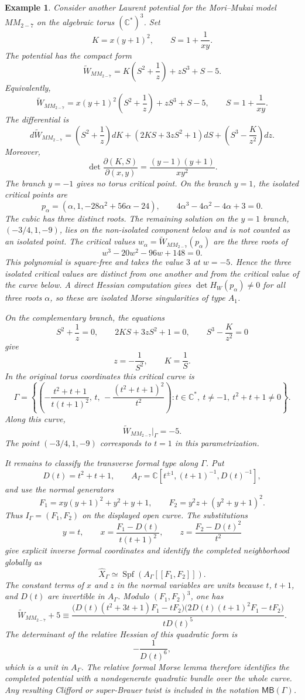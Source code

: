 \documentclass[11pt]{amsart}
\newtheorem{example}{Example}[section]
\newcommand{\MBcat}[1]{\mathsf{MB}(#1)}
\begin{document}
\begin{example}
Consider another Laurent potential for the Mori--Mukai model $MM_{2-7}$ on the
algebraic torus $(\mathbb{C}^*)^3$. Set
\[
K=x(y+1)^2,
\qquad
S=1+\frac{1}{xy}.
\]
The potential has the compact form
\[
\widetilde W_{MM_{2-7}}=K\left(S^2+\frac{1}{z}\right)+zS^3+S-5.
\]
Equivalently,
\[
\widetilde W_{MM_{2-7}}
=x(y+1)^2\left(S^2+\frac{1}{z}\right)+zS^3+S-5,
\qquad S=1+\frac{1}{xy}.
\]
The differential is
\[
d\widetilde W_{MM_{2-7}}
=\left(S^2+\frac{1}{z}\right)dK
+\left(2KS+3zS^2+1\right)dS
+\left(S^3-\frac{K}{z^2}\right)dz.
\]
Moreover,
\[
\det\frac{\partial(K,S)}{\partial(x,y)}=\frac{(y-1)(y+1)}{xy^2}.
\]
The branch $y=-1$ gives no torus critical point. On the branch $y=1$, the
isolated critical points are
\[
p_{\alpha}=\left(\alpha,1,-28\alpha^2+56\alpha-24\right),
\qquad
4\alpha^3-4\alpha^2-4\alpha+3=0.
\]
The cubic has three distinct roots. The remaining solution on the $y=1$ branch,
$(-3/4,1,-9)$, lies on the non-isolated component below and is not counted as
an isolated point. The critical values
$w_{\alpha}=\widetilde W_{MM_{2-7}}(p_{\alpha})$ are the three roots of
\[
w^3-20w^2-96w+148=0.
\]
This polynomial is square-free and takes the value $3$ at $w=-5$. Hence the
three isolated critical values are distinct from one another and from the
critical value of the curve below.
A direct Hessian computation gives $\det H_W(p_{\alpha})\neq0$ for all three
roots $\alpha$, so these are isolated Morse singularities of type $A_1$.

On the complementary branch, the equations
\[
S^2+\frac{1}{z}=0,
\qquad
2KS+3zS^2+1=0,
\qquad
S^3-\frac{K}{z^2}=0
\]
give
\[
z=-\frac{1}{S^2},
\qquad
K=\frac{1}{S}.
\]
In the original torus coordinates this critical curve is
\[
\Gamma=\left\{\left(-\frac{t^2+t+1}{t(t+1)^2},\,t,\,-\frac{(t^2+t+1)^2}{t^2}\right):
t\in\mathbb{C}^*,\ t\neq -1,\ t^2+t+1\neq0\right\}.
\]
Along this curve,
\[
\widetilde W_{MM_{2-7}}|_{\Gamma}=-5.
\]
The point $(-3/4,1,-9)$ corresponds to $t=1$ in this parametrization.

It remains to classify the transverse formal type along $\Gamma$. Put
\[
D(t)=t^2+t+1,
\qquad
A_{\Gamma}=\mathbb C[t^{\pm1},(t+1)^{-1},D(t)^{-1}],
\]
and use the normal generators
\[
F_1=xy(y+1)^2+y^2+y+1,
\qquad
F_2=y^2z+(y^2+y+1)^2.
\]
Thus $I_{\Gamma}=(F_1,F_2)$ on the displayed open curve. The substitutions
\[
y=t,
\qquad
x=\frac{F_1-D(t)}{t(t+1)^2},
\qquad
z=\frac{F_2-D(t)^2}{t^2}
\]
give explicit inverse formal coordinates and identify the completed
neighborhood globally as
\[
\widehat X_{\Gamma}\simeq
\operatorname{Spf}(A_{\Gamma}[[F_1,F_2]]).
\]
The constant terms of $x$ and $z$ in the normal variables are units because
$t$, $t+1$, and $D(t)$ are invertible in $A_{\Gamma}$. Modulo
$(F_1,F_2)^3$, one has
\[
\widetilde W_{MM_{2-7}}+5\equiv
\frac{\bigl(D(t)(t^2+3t+1)F_1-tF_2\bigr)
\bigl(2D(t)(t+1)^2F_1-tF_2\bigr)}{tD(t)^5}.
\]
The determinant of the relative Hessian of this quadratic form is
\[
-\frac{1}{D(t)^6},
\]
which is a unit in $A_{\Gamma}$. The relative formal Morse lemma therefore
identifies the completed potential with a nondegenerate quadratic bundle over
the whole curve. Any resulting Clifford or super-Brauer twist is included in
the notation $\MBcat{\Gamma}$.


\end{example}
\end{document}
